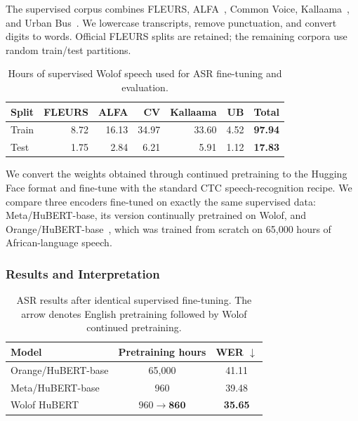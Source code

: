 The supervised corpus combines FLEURS, ALFA~\citep{gauthierSSL}, Common Voice, Kallaama~\citep{kallama}, and Urban Bus~\citep{urbanbus}. We lowercase transcripts, remove punctuation, and convert digits to words. Official FLEURS splits are retained; the remaining corpora use random train/test partitions.

\begin{table}[ht]
    \centering
    \begin{tabular}{lrrrrrr}
        \toprule
        \textbf{Split} & \textbf{FLEURS} & \textbf{ALFA} & \textbf{CV} & \textbf{Kallaama} & \textbf{UB} & \textbf{Total} \\
        \midrule
        Train & 8.72 & 16.13 & 34.97 & 33.60 & 4.52 & \textbf{97.94} \\
        Test & 1.75 & 2.84 & 6.21 & 5.91 & 1.12 & \textbf{17.83} \\
        \bottomrule
    \end{tabular}
    \caption{Hours of supervised Wolof speech used for ASR fine-tuning and evaluation.}
    \label{tab:wolof-asr-data}
\end{table}

We convert the weights obtained through continued pretraining to the Hugging Face format and fine-tune with the standard CTC speech-recognition recipe. We compare three encoders fine-tuned on exactly the same supervised data: Meta/\allowbreak HuBERT-base, its version continually pretrained on Wolof, and Orange/\allowbreak HuBERT-base~\citep{afribert}, which was trained from scratch on 65,000 hours of African-language speech.

\subsubsection{Results and Interpretation}

\begin{table}[ht]
    \centering
    \begin{tabular}{lcc}
        \toprule
        \textbf{Model} & \textbf{Pretraining hours} & \textbf{WER \(\downarrow\)} \\
        \midrule
        Orange/HuBERT-base & 65,000 & 41.11 \\
        Meta/HuBERT-base & 960 & 39.48 \\
        Wolof HuBERT & \(960\rightarrow\mathbf{860}\) & \textbf{35.65} \\
        \bottomrule
    \end{tabular}
    \caption{ASR results after identical supervised fine-tuning. The arrow denotes English pretraining followed by Wolof continued pretraining.}
    \label{tab:wolof-hubert-wer}
\end{table}


